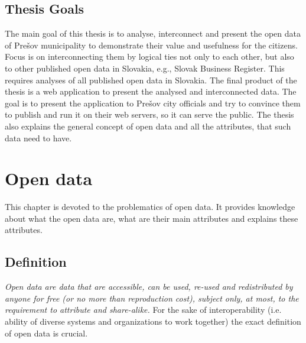 \documentclass[thesis=B,english]{FITthesis}[2012/06/26]
\begin{document}
\begin{introduction}
	\section*{Thesis Goals}
	The main goal of this thesis is to analyse, interconnect and present the open data of Prešov municipality to demonstrate their value and usefulness for the citizens. Focus is on interconnecting them by logical ties not only to each other, but also to other published open data in Slovakia, e.g., Slovak Business Register. This requires analyses of all published open data in Slovakia. The final product of the thesis is a web application to present the analysed and interconnected data. The goal is to present the application to Prešov city officials and try to convince them to publish and run it on their web servers, so it can serve the public. The thesis also explains the general concept of open data and all the attributes, that such data need to have.

\end{introduction}

\chapter{Open data}
	This chapter is devoted to the problematics of open data. It provides knowledge about what the open data are, what are their main attributes and explains these attributes.
	\section{Definition}
	\textit{Open data are data that are accessible, can be used, re-used and redistributed by anyone for free (or no more than reproduction cost), subject only, at most, to the requirement to attribute and share-alike.}\cite{opendatahandbook} \linebreak For the sake of interoperability (i.e. ability of diverse systems and organizations to work together) the exact definition of open data is crucial.
\end{document}
